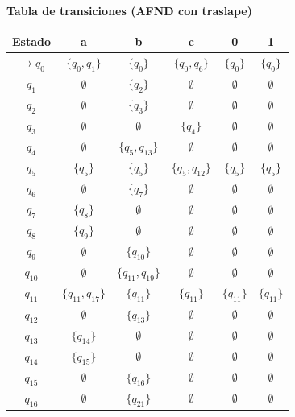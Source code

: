 \documentclass[12pt]{article}
\begin{document}
\begin{center}   

    \textbf{Tabla de transiciones (AFND con traslape)} \\
    \vspace{0.3cm}
    \begin{tabular}{c|ccccc}
        Estado & a & b & c & 0 & 1 \\
        \hline
        $\rightarrow q_0$ & $\{q_0, q_1\}$ & $\{q_0\}$ & $\{q_0, q_6\}$ & $\{q_0\}$ & $\{q_0\}$ \\
        $q_1$ & $\emptyset$ & $\{q_2\}$ & $\emptyset$ & $\emptyset$ & $\emptyset$ \\
        $q_2$ & $\emptyset$ & $\{q_3\}$ & $\emptyset$ & $\emptyset$ & $\emptyset$ \\
        $q_3$ & $\emptyset$ & $\emptyset$ & $\{q_4\}$ & $\emptyset$ & $\emptyset$ \\
        $q_4$ & $\emptyset$ & $\{q_5, q_{13}\}$ & $\emptyset$ & $\emptyset$ & $\emptyset$ \\
        $q_5$ & $\{q_5\}$ & $\{q_5\}$ & $\{q_5, q_{12}\}$ & $\{q_5\}$ & $\{q_5\}$ \\
        $q_6$ & $\emptyset$ & $\{q_7\}$ & $\emptyset$ & $\emptyset$ & $\emptyset$ \\
        $q_7$ & $\{q_8\}$ & $\emptyset$ & $\emptyset$ & $\emptyset$ & $\emptyset$ \\
        $q_8$ & $\{q_9\}$ & $\emptyset$ & $\emptyset$ & $\emptyset$ & $\emptyset$ \\
        $q_9$ & $\emptyset$ & $\{q_{10}\}$ & $\emptyset$ & $\emptyset$ & $\emptyset$ \\
        $q_{10}$ & $\emptyset$ & $\{q_{11}, q_{19}\}$ & $\emptyset$ & $\emptyset$ & $\emptyset$ \\
        $q_{11}$ & $\{q_{11}, q_{17}\}$ & $\{q_{11}\}$ & $\{q_{11}\}$ & $\{q_{11}\}$ & $\{q_{11}\}$ \\
        $q_{12}$ & $\emptyset$ & $\{q_{13}\}$ & $\emptyset$ & $\emptyset$ & $\emptyset$ \\
        $q_{13}$ & $\{q_{14}\}$ & $\emptyset$ & $\emptyset$ & $\emptyset$ & $\emptyset$ \\
        $q_{14}$ & $\{q_{15}\}$ & $\emptyset$ & $\emptyset$ & $\emptyset$ & $\emptyset$ \\
        $q_{15}$ & $\emptyset$ & $\{q_{16}\}$ & $\emptyset$ & $\emptyset$ & $\emptyset$ \\
        $q_{16}$ & $\emptyset$ & $\{q_{21}\}$ & $\emptyset$ & $\emptyset$ & $\emptyset$ \\

\end{tabular}
\end{center}
\end{document}
